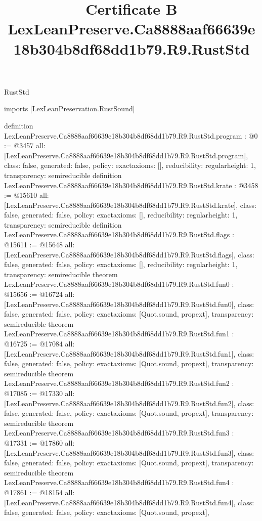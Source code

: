 \begin{lexlean}{RustStd}
\title{Certificate B LexLeanPreserve.Ca8888aaf66639e18b304b8df68dd1b79.R9.RustStd}
\begin{coremodule}
imports [LexLeanPreservation.RustSound]

definition LexLeanPreserve.Ca8888aaf66639e18b304b8df68dd1b79.R9.RustStd.program : @0 := @3457 {
  all: [LexLeanPreserve.Ca8888aaf66639e18b304b8df68dd1b79.R9.RustStd.program],
  class: false,
  generated: false,
  policy: exact{axioms: []},
  reducibility: regular{height: 1},
  transparency: semireducible
}
definition LexLeanPreserve.Ca8888aaf66639e18b304b8df68dd1b79.R9.RustStd.krate : @3458 := @15610 {
  all: [LexLeanPreserve.Ca8888aaf66639e18b304b8df68dd1b79.R9.RustStd.krate],
  class: false,
  generated: false,
  policy: exact{axioms: []},
  reducibility: regular{height: 1},
  transparency: semireducible
}
definition LexLeanPreserve.Ca8888aaf66639e18b304b8df68dd1b79.R9.RustStd.flags : @15611 := @15648 {
  all: [LexLeanPreserve.Ca8888aaf66639e18b304b8df68dd1b79.R9.RustStd.flags],
  class: false,
  generated: false,
  policy: exact{axioms: []},
  reducibility: regular{height: 1},
  transparency: semireducible
}
theorem LexLeanPreserve.Ca8888aaf66639e18b304b8df68dd1b79.R9.RustStd.fun0 : @15656 := @16724 {
  all: [LexLeanPreserve.Ca8888aaf66639e18b304b8df68dd1b79.R9.RustStd.fun0],
  class: false,
  generated: false,
  policy: exact{axioms: [Quot.sound, propext]},
  transparency: semireducible
}
theorem LexLeanPreserve.Ca8888aaf66639e18b304b8df68dd1b79.R9.RustStd.fun1 : @16725 := @17084 {
  all: [LexLeanPreserve.Ca8888aaf66639e18b304b8df68dd1b79.R9.RustStd.fun1],
  class: false,
  generated: false,
  policy: exact{axioms: [Quot.sound, propext]},
  transparency: semireducible
}
theorem LexLeanPreserve.Ca8888aaf66639e18b304b8df68dd1b79.R9.RustStd.fun2 : @17085 := @17330 {
  all: [LexLeanPreserve.Ca8888aaf66639e18b304b8df68dd1b79.R9.RustStd.fun2],
  class: false,
  generated: false,
  policy: exact{axioms: [Quot.sound, propext]},
  transparency: semireducible
}
theorem LexLeanPreserve.Ca8888aaf66639e18b304b8df68dd1b79.R9.RustStd.fun3 : @17331 := @17860 {
  all: [LexLeanPreserve.Ca8888aaf66639e18b304b8df68dd1b79.R9.RustStd.fun3],
  class: false,
  generated: false,
  policy: exact{axioms: [Quot.sound, propext]},
  transparency: semireducible
}
theorem LexLeanPreserve.Ca8888aaf66639e18b304b8df68dd1b79.R9.RustStd.fun4 : @17861 := @18154 {
  all: [LexLeanPreserve.Ca8888aaf66639e18b304b8df68dd1b79.R9.RustStd.fun4],
  class: false,
  generated: false,
  policy: exact{axioms: [Quot.sound, propext]},
}
\end{coremodule}
\end{lexlean}
